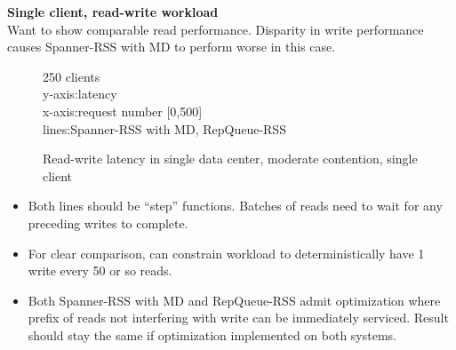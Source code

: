 \documentclass[letterpaper, 11pt]{article}
\begin{document}
\textbf{Single client, read-write workload} \\ 
Want to show comparable read performance. Disparity in write performance causes Spanner-RSS with MD to perform worse in this case.
\begin{figure}[H]
  \centering
   \begin{tcolorbox}[width=0.5\textwidth, sharp corners=all, frame empty]
    250 clients\\
    y-axis:latency\\
    x-axis:request number [0,500] \\
    lines:Spanner-RSS with MD, RepQueue-RSS
  \end{tcolorbox} 
  \caption{Read-write latency in single data center, moderate contention, single client}
\end{figure}

\begin{itemize}
\item Both lines should be ``step'' functions. Batches of reads need to wait for any preceding writes to complete.
\item For clear comparison, can constrain workload to deterministically have 1 write every 50 or so reads.
\item Both Spanner-RSS with MD and RepQueue-RSS admit optimization where prefix of reads not interfering with write can be immediately serviced. Result should stay the same if optimization implemented on both systems. 
\end{itemize}
\end{document}
